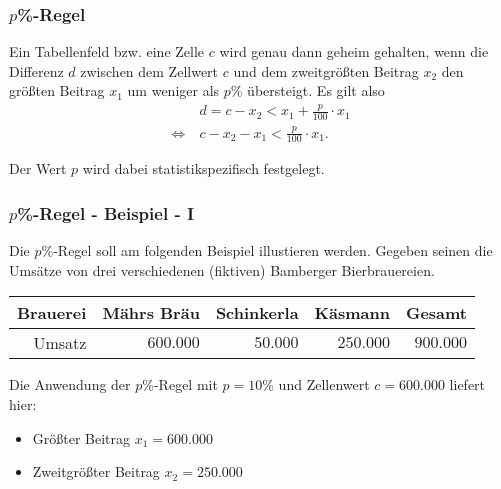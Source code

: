 \documentclass[aspectratio=169]{beamer}
\begin{document}
\begin{frame}
    \frametitle{$p$\%-Regel}
    \begin{theorem}[$p$\%-Regel]
        Ein Tabellenfeld bzw. eine Zelle $c$ wird genau dann geheim gehalten, wenn die Differenz $d$ zwischen dem Zellwert $c$ und dem zweitgrößten Beitrag $x_2$ den größten Beitrag $x_1$ um weniger als $p$\% übersteigt. Es gilt also 
        \begin{align}
            & d = c - x_2 < x_1 + \frac{p}{100} \cdot x_1 \\
            \Leftrightarrow \: & c - x_2 - x_ 1 <  \frac{p}{100} \cdot x_1.
        \end{align}
    \end{theorem}
    Der Wert $p$ wird dabei statistikspezifisch festgelegt.
\end{frame}


\begin{frame}
    \frametitle{$p$\%-Regel - Beispiel - I}
    Die $p$\%-Regel soll am folgenden Beispiel illustieren werden. Gegeben seinen die Umsätze von drei verschiedenen (fiktiven) Bamberger Bierbrauereien.
    \begin{center}
        \begin{tabular}{ r r r r r }
            \textbf{Brauerei} \vline & \textbf{Mährs Bräu} & \textbf{Schinkerla} & \textbf{Käsmann} & \textbf{Gesamt} \\ 
            \hline
            Umsatz \vline & $600.000$ & $50.000$ & $250.000$ & $900.000$
           \end{tabular}
    \end{center}
    Die Anwendung der $p$\%-Regel mit $p = 10 \%$ und Zellenwert $c = 600.000$ liefert hier:
    \begin{itemize}
        \item Größter Beitrag $x_1 = 600.000$
        \item Zweitgrößter Beitrag $x_2 = 250.000$
    \end{itemize}
\end{frame}
\end{document}
